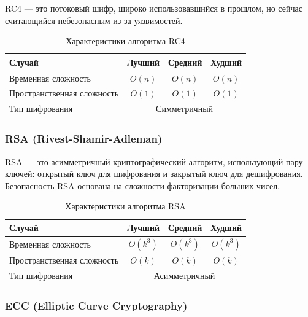 \documentclass[a4paper,12pt]{article}
\begin{document}
RC4 --- это потоковый шифр, широко использовавшийся в прошлом, но сейчас считающийся небезопасным из-за уязвимостей.

\begin{table}[H]
    \centering
    \begin{tabular}{|l|c|c|c|}
        \hline
        Случай & Лучший & Средний & Худший \\
        \hline
        Временная сложность & $O(n)$ & $O(n)$ & $O(n)$ \\
        \hline
        Пространственная сложность & $O(1)$ & $O(1)$ & $O(1)$ \\
        \hline
        Тип шифрования & \multicolumn{3}{c|}{Симметричный} \\
        \hline
    \end{tabular}
    \caption{Характеристики алгоритма RC4}
\end{table}

\subsubsection{RSA (Rivest-Shamir-Adleman)}
\label{subsubsec:rsa-rivest-shamir-adleman}

RSA --- это асимметричный криптографический алгоритм, использующий пару ключей: открытый ключ для шифрования и закрытый ключ для дешифрования. Безопасность RSA основана на сложности факторизации больших чисел.

\begin{table}[H]
    \centering
    \begin{tabular}{|l|c|c|c|}
        \hline
        Случай & Лучший & Средний & Худший \\
        \hline
        Временная сложность & $O(k^3)$ & $O(k^3)$ & $O(k^3)$ \\
        \hline
        Пространственная сложность & $O(k)$ & $O(k)$ & $O(k)$ \\
        \hline
        Тип шифрования & \multicolumn{3}{c|}{Асимметричный} \\
        \hline
    \end{tabular}
    \caption{Характеристики алгоритма RSA}
\end{table}

\subsubsection{ECC (Elliptic Curve Cryptography)}
\label{subsubsec:ecc-elliptic-curve-cryptography}
\end{document}
